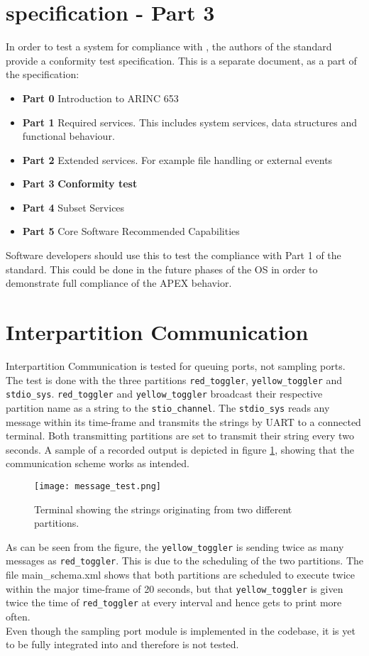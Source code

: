 \section{\arinc{} specification - Part 3}
In order to test a system for compliance with \arinc{},
the authors of the standard provide a conformity test
specification. This is a separate document, as a part of the
\arinc{} specification:
\begin{itemize}
	\item\textbf{Part 0} Introduction to ARINC 653
	\item\textbf{Part 1} Required services. This includes system services,
	data structures and functional behaviour.
	\item\textbf{Part 2} Extended services. For example file handling or external events
	\item\textbf{Part 3} \textbf{Conformity test}
	\item\textbf{Part 4} Subset Services
	\item\textbf{Part 5} Core Software Recommended Capabilities
\end{itemize}

Software developers should use this to test the compliance with
Part 1 of the standard. This could be done in the future phases of the \OSname{} OS in order
to demonstrate full compliance of the APEX behavior.


\section{Interpartition Communication}
Interpartition Communication is tested for queuing ports, not sampling ports.
The test is done with the three partitions \texttt{red\_toggler},
\texttt{yellow\_toggler} and \texttt{stdio\_sys}. \texttt{red\_toggler} and
\texttt{yellow\_toggler} broadcast their respective partition name as a string
to the \texttt{stio\_channel}. The \texttt{stdio\_sys} reads any message within its
time-frame and transmits the strings by UART to a connected terminal. Both
transmitting partitions are set to transmit their string every two seconds. A
sample of a recorded output is depicted in figure \ref{fig:message_test},
showing that the communication scheme works as intended.

\begin{figure}[H]
	\centering
	\texttt{[image: message\_test.png]}
	\caption{Terminal showing the strings originating from two different
		partitions.}
	\label{fig:message_test}
\end{figure}

As can be seen from the figure, the \texttt{yellow\_toggler} is sending twice as
many messages as \texttt{red\_toggler}. This is due to the scheduling of the two
partitions. The file main\_schema.xml shows that both partitions are
scheduled to execute twice within the major time-frame of 20 seconds, but that
\texttt{yellow\_toggler} is given twice the time of \texttt{red\_toggler} at
every interval and hence gets to print more often.\\

Even though the sampling port module is implemented in the codebase, it is yet
to be fully integrated into \OSname{} and therefore is not tested.
